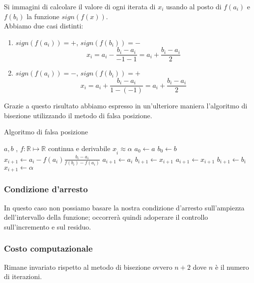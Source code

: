\documentclass[12pt, a4paper]{book}
\theoremstyle{definition}
\begin{document}
\begin{flushleft}
Si immagini di calcolare il valore di ogni iterata di $x_{i}$ usando al posto di $f(a_{i})$ e $f(b_{i})$ la funzione $sign(f(x))$.\\
Abbiamo due casi distinti:
\begin{enumerate}
	\item $sign(f(a_{i})) = +$, $sign(f(b_{i})) = -$ 
		\[
		 	x_{i} = a_{i} -  \frac{b_{i} - a_{i}}{-1 - 1} =  a_{i} +  \frac{b_{i} - a_{i}}{2} 
		\]
	\item $sign(f(a_{i})) = -$, $sign(f(b_{i})) = +$ 
		\[
		 	x_{i} = a_{i} +  \frac{b_{i} - a_{i}}{1 - (-1)} =  a_{i} +  \frac{b_{i} - a_{i}}{2} 
		\]
\end{enumerate}
Grazie a questo risultato abbiamo espresso in un'ulteriore maniera l'algoritmo di bisezione utilizzando il metodo di falsa posizione.
\begin{algorithm}
\caption{Algoritmo di falsa posizione}
	\begin{algorithmic} 
		\REQUIRE $a, b$ , $f : \mathbb{R} \mapsto \mathbb{R}$ continua e derivabile
		\ENSURE $x_{\hat{i}} \approx \alpha$
		\STATE $ a_{0} \leftarrow  a$
		\STATE $ b_{0} \leftarrow  b$
			\STATE $ x_{i+1} \leftarrow  a_{i} - f(a_{i})  \frac{b_{i} - a_{i}}{f(b_{i}) - f(a_{i})}$
				\STATE $ a_{i+1} \leftarrow  a_{i}$
				\STATE $ b_{i+1} \leftarrow  x_{i+1}$
			\ENDIF
				\STATE $ a_{i+1} \leftarrow  x_{i+1}$
				\STATE $ b_{i+1} \leftarrow  b_{i}$
			\ENDIF
				\STATE $ x_{i+1} \leftarrow  \alpha$
			\ENDIF
		\ENDWHILE
	\end{algorithmic}
\end{algorithm}

\subsubsection{Condizione d'arresto}
In questo caso non possiamo basare la nostra condizione d'arresto sull'ampiezza dell'intervallo della funzione; occorrerà quindi adoperare il controllo sull'incremento e sul residuo. 

\subsubsection{Costo computazionale}
Rimane invariato rispetto al metodo di bisezione ovvero $n + 2$ dove $n$ è il numero di iterazioni.
\end{flushleft}
\end{document}
